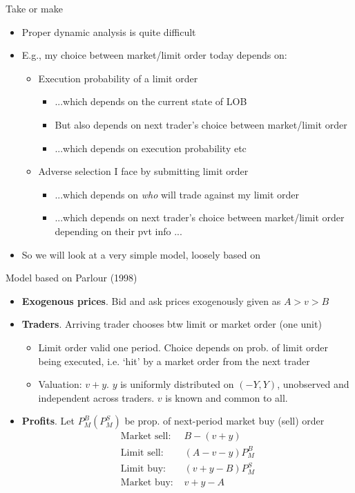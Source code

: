 \documentclass[english,10pt
,aspectratio=169
]{beamer}
\begin{document}
\begin{frame}{Take or make}
	\begin{itemize}
		\item Proper dynamic analysis is quite difficult
		\item E.g., my choice between market/limit order today depends on:
		\begin{itemize}
			\item Execution probability of a limit order
			\begin{itemize}
				\item ...which depends on the current state of LOB
				\item But also depends on next trader's choice between market/limit order
				\item ...which depends on execution probability etc
			\end{itemize}
			\item Adverse selection I face by submitting limit order
			\begin{itemize}
				\item ...which depends on \emph{who} will trade against my limit order
				\item ...which depends on next trader's choice between market/limit order depending on their pvt info ...
			\end{itemize}
		\end{itemize}
		\item So we will look at a very simple model, loosely based on \cite{parlour_price_1998}
	\end{itemize}
\end{frame}


\begin{frame}{Model based on Parlour (1998)}
	\begin{itemize}
		\item \textbf{Exogenous prices}. Bid and ask prices exogenously given as $A>v>B$
		\item \textbf{Traders}. Arriving trader chooses btw limit or market order (one unit)
		\begin{itemize}
			\item Limit order valid one period. Choice depends on prob. of limit order being executed, i.e. `hit' by a market order from the next trader
			\item Valuation: $v+y$. $y$ is uniformly distributed on $(-Y,Y)$, unobserved and independent across traders. $v$ is known and common to all.
		\end{itemize}
		\item \textbf{Profits}. Let $P^B_M (P^S_M)$ be prop. of next-period market buy (sell) order 
		\begin{align*}
		\text{Market sell: } & B-(v+y) \\
		\text{Limit sell: } & (A-v-y)P^B_M \\
		\text{Limit buy: } &(v+y-B)P^S_M \\
		\text{Market buy: } &v+y-A
		\end{align*}
	\end{itemize}
\end{frame}
\end{document}
